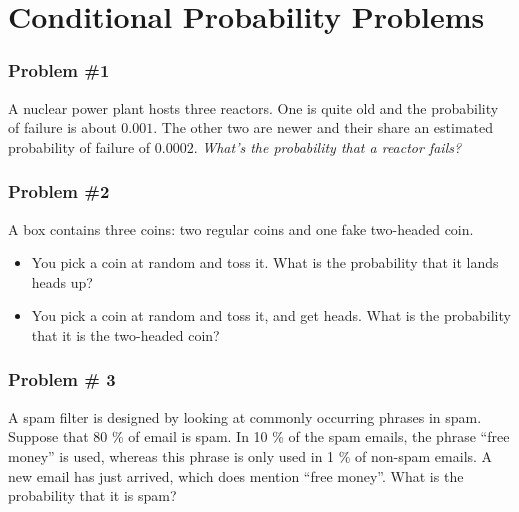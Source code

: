 \documentclass[aspectratio=169,11pt,usenames,dvipsnames]{beamer}
\begin{document}
\section{Conditional Probability Problems}

\begin{frame}
 \frametitle{Problem \#1}
 A nuclear power plant hosts three reactors. One is quite old and the
 probability of failure is about $0.001$. The other two are newer and their
 share an estimated probability of failure of $0.0002$. \emph{What's the
 probability that a reactor fails?}
\end{frame}

\begin{frame}
 \frametitle{Problem \#2}
 A box contains three coins: two regular coins and one fake two-headed coin.
 \begin{itemize}
  \item You pick a coin at random and toss it. What is the probability that it
   lands heads up?
  \item You pick a coin at random and toss it, and get heads. What is the
   probability that it is the two-headed coin?
 \end{itemize}
\end{frame}

\begin{frame}
 \frametitle{Problem \# 3}
 A spam filter is designed by looking at commonly occurring phrases in spam.
 Suppose that 80 \% of email is spam. In 10 \% of the spam emails, the phrase
 “free money” is used, whereas this phrase is only used in 1 \% of non-spam
 emails. A new email has just arrived, which does mention “free money”. What is
 the probability that it is spam?
\end{frame}
\end{document}
